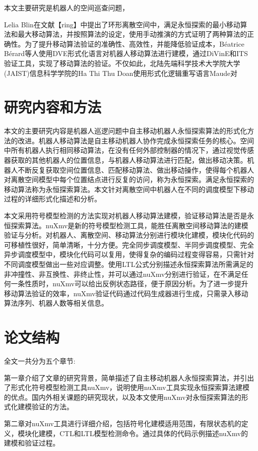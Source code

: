 本文主要研究是机器人的空间巡查问题，


Lelia Blin在文献【ring】中提出了环形离散空间中，满足永恒探索的最小移动算法和最大移动算法，并按照算法的设定，使用手动推演的方式证明了两种算法的正确性。为了提升移动算法验证的准确性、高效性，并能降低验证成本，Béatrice Bérard等人使用DVE形式化语言对机器人移动算法进行建模，通过DiVinE和ITS验证工具，实现了移动算法的验证。不仅如此，北陆先端科学技术大学院大学(JAIST)信息科学学院的Ha Thi Thu Doan使用形式化逻辑重写语言Maude对


\section{研究内容和方法}
本文的主要研究内容是机器人巡逻问题中自主移动机器人永恒探索算法的形式化方法的改进。机器人移动算法是自主移动机器人协作完成永恒探索任务的核心。空间中所有机器人执行相同移动算法，在没有任何外部控制器的情况下，通过视觉传感器获取的其他机器人的位置信息，与机器人移动算法进行匹配，做出移动决策。机器人不断反复获取空间位置信息、匹配移动算法、做出移动操作，使得每个机器人对离散空间模型中每个位置结点进行反复的访问，称为永恒探索。满足永恒探索的移动算法称为永恒探索算法。本文针对离散空间中机器人在不同的调度模型下移动过程的详细形式化描述和分析。

本文采用符号模型检测的方法实现对机器人移动算法建模，验证移动算法是否是永恒探索算法。nuXmv是新的符号模型检测工具，能胜任离散空间移动算法的建模验证与分析。对机器人、离散空间、移动算法分别进行模块化建模，模块化代码的可移植性很好，简单清晰，十分方便。完全同步调度模型、半同步调度模型、完全异步调度模型中，模块化代码可以复用，使得复杂的编码过程变得容易，只需针对不同调度模型做出一些对应调整。使用LTL公式分别描述永恒探索算法所需满足的非冲撞性、非互换性、非终止性，并可以通过nuXmv分别进行验证，在不满足任何一条性质时，nuXmv可以给出反例状态路径，便于原因分析。为了进一步提升移动算法验证的效率，nuXmv验证代码通过代码生成器进行生成，只需录入移动算法序列、机器人数等相关信息。

\section{论文结构}
全文一共分为五个章节:

第一章介绍了文章的研究背景，简单描述了自主移动机器人永恒探索算法，并引出了形式化符号模型检测工具nuXmv，说明使用nuXmv工具实现永恒探索算法建模的优点。国内外相关课题的研究现状，以及本文使用nuXmv对永恒探索算法的形式化建模验证的方法。

第二章对nuXmv工具进行详细介绍，包括符号化建模适用范围，有限状态机的定义，模块化建模，CTL和LTL模型检测命令。通过具体的代码示例描述nuXmv的建模和验证过程。

